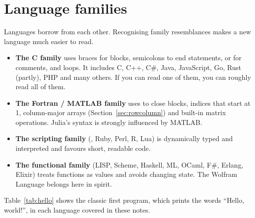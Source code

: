 \section{Language families}

Languages borrow from each other. Recognising family resemblances makes a new language
much easier to read.

\begin{itemize}
\item \textbf{The C family} uses braces \code{\{\}} for blocks, semicolons to end
  statements, \code{//} or \code{/* */} for comments, and 
  loops. It includes C, C++, C\#, Java, JavaScript, Go, Rust (partly), PHP and many
  others. If you can read one of them, you can roughly read all of them.
\item \textbf{The Fortran / MATLAB family} uses  to close blocks, indices that
  start at 1, column-major arrays (Section~\ref{sec:rowcolumn}) and built-in matrix
  operations. Julia's syntax is strongly influenced by MATLAB.
\item \textbf{The scripting family} (\py, Ruby, Perl, R, Lua) is dynamically typed and
  interpreted and favours short, readable code.
\item \textbf{The functional family} (LISP, Scheme, Haskell, ML, OCaml, F\#, Erlang,
  Elixir) treats functions as values and avoids changing state. The Wolfram Language
  belongs here in spirit.
\end{itemize}

Table~\ref{tab:hello} shows the classic first program, which prints the words
``Hello, world!'', in each language covered in these notes.

